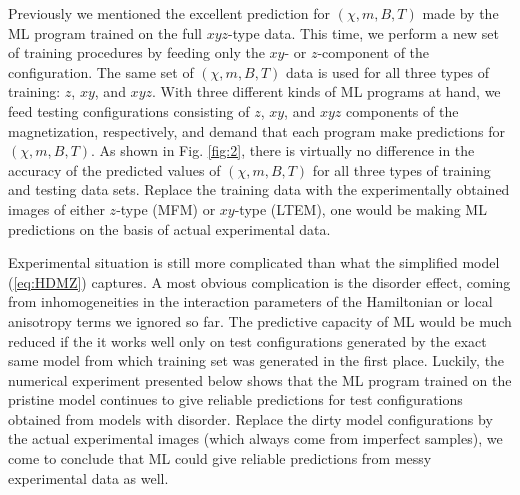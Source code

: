 \documentclass[reprint,amsmath,amssymb,aps,showpacs,superscriptaddress,prl]{revtex4-1}
\begin{document}
Previously we mentioned the excellent prediction for $(\chi, m, B, T)$ made by the ML program trained on the full $xyz$-type data. This time, we perform a new set of training procedures by feeding only the $xy$- or $z$-component of the configuration. The same set of $(\chi, m, B, T)$ data is used for all three types of training: $z$, $xy$, and $xyz$. With three different kinds of ML programs at hand, we feed testing configurations consisting of $z$, $xy$, and $xyz$ components of the magnetization, respectively, and demand that each program make predictions for $(\chi, m, B, T)$. As shown in Fig. \ref{fig:2}, there is virtually no difference in the accuracy of the predicted values of $(\chi, m, B, T)$ for all three types of training and testing data sets. Replace the training data with the experimentally obtained images of either $z$-type (MFM) or $xy$-type (LTEM), one would be making ML predictions on the basis of actual experimental data.

Experimental situation is still more complicated than what the simplified model (\ref{eq:HDMZ}) captures. A most obvious complication is the disorder effect, coming from inhomogeneities in the interaction parameters of the Hamiltonian or local anisotropy terms we ignored so far. The predictive capacity of ML would be much reduced if the it works well only on test  configurations generated by the exact same model from which training set was generated in the first place. Luckily, the numerical experiment presented below shows that the ML program trained on the pristine model continues to give reliable predictions for test configurations obtained from models with disorder. Replace the dirty model configurations by the actual experimental images (which always come from imperfect samples), we come to conclude that ML could give reliable predictions from messy experimental data as well.
\end{document}
